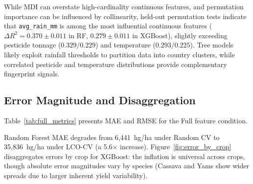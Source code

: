 \documentclass[conference]{IEEEtran}
\begin{document}
While MDI can overstate high-cardinality continuous features, and permutation 
importance can be influenced by collinearity, held-out permutation tests indicate 
that \texttt{avg\_rain\_mm} is among the most influential continuous features 
($\Delta R^2 = 0.370 \pm 0.011$ in RF, $0.279 \pm 0.011$ in XGBoost), slightly 
exceeding pesticide tonnage ($0.329 / 0.229$) and temperature ($0.293 / 0.225$). 
Tree models likely exploit rainfall thresholds to partition data into country clusters, 
while correlated pesticide and temperature distributions provide complementary 
fingerprint signals.

\subsection{Error Magnitude and Disaggregation}

Table~\ref{tab:full_metrics} presents MAE and RMSE for the Full feature condition.

\begin{table}[t]
\centering
\caption{MAE and RMSE (hg/ha) by Model and Protocol (Full Features, mean $\pm$ SD)}
\label{tab:full_metrics}
\end{table}

Random Forest MAE degrades from 6{,}441~hg/ha under Random CV to 35{,}836~hg/ha 
under LCO-CV (a 5.6$\times$ increase). Figure~\ref{fig:error_by_crop} disaggregates 
errors by crop for XGBoost: the inflation is universal across crops, though absolute 
error magnitudes vary by species (Cassava and Yams show wider spreads due to larger 
inherent yield variability).
\end{document}
